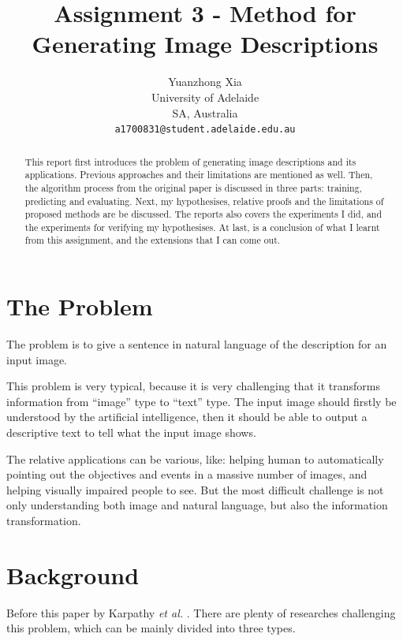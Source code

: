 \documentclass[10pt,twocolumn,letterpaper]{article}
\begin{document}
\title{Assignment 3 - Method for Generating Image Descriptions}
\author{Yuanzhong Xia\\
University of Adelaide\\
SA, Australia\\
{\tt\small a1700831@student.adelaide.edu.au}
}
\maketitle

\begin{abstract}
This report first introduces the problem of generating image descriptions and its applications.
Previous approaches and their limitations are mentioned as well.
Then, the algorithm process from the original paper is discussed in three parts:
training, predicting and evaluating.
Next, my hypothesises, relative proofs and the limitations of proposed methods are be discussed.
The reports also covers the experiments I did, and the experiments for verifying my hypothesises.
At last, is a conclusion of what I learnt from this assignment, and the extensions that I can come out.
\end{abstract}

\section{The Problem}
The problem is to give a sentence in natural language of the description for an input image.

This problem is very typical, because it is very challenging that it transforms information from ``image'' type to ``text'' type.
The input image should firstly be understood by the artificial intelligence,
then it should be able to output a descriptive text to tell what the input image shows.

The relative applications can be various, like: helping human to automatically pointing out the objectives and events in a massive number of images,
and helping visually impaired people to see. But the most difficult challenge is not only understanding both image and natural language,
but also the information transformation.


\section{Background}
Before this paper by Karpathy \textit{et al.} \cite{origin}. There are plenty of researches challenging this problem,
which can be mainly divided into three types.
\end{document}

